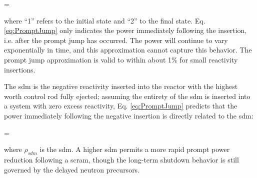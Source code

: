 \beq
\label{eq:PromptJump}
=
\eeq

where ``1'' refers to the initial state and ``2'' to the final state. Eq. \eqref{eq:PromptJump} only indicates the power immediately following the insertion, i.e. after the prompt jump has occurred. The power will continue to vary exponentially in time, and this approximation cannot capture this behavior. The prompt jump approximation is valid to within about 1\% for small reactivity insertions.

The \gls{sdm} is the negative reactivity inserted into the reactor with the highest worth control rod fully ejected; assuming the entirety of the \gls{sdm} is inserted into a system with zero excess reactivity, Eq. \eqref{eq:PromptJump} predicts that the power immediately following the negative insertion is directly related to the \gls{sdm}:

\beq
{}=
\eeq

where \(\rho_{sdm}\) is the \gls{sdm}. A higher \gls{sdm} permits a more rapid prompt power reduction following a scram, though the long-term shutdown behavior is still governed by the delayed neutron precursors.
